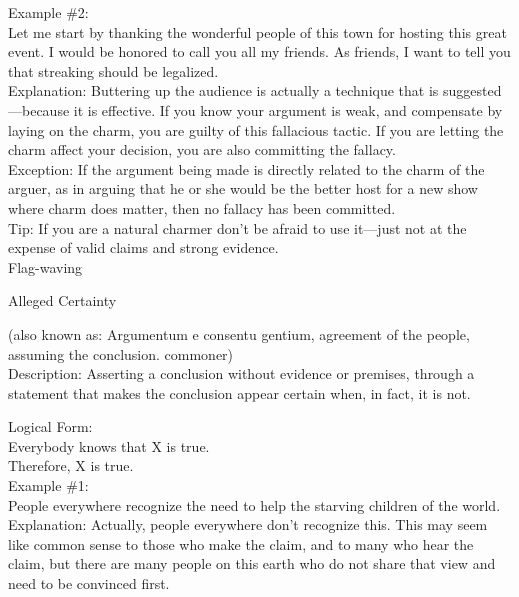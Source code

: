 \documentclass[a4paper,12pt,single,pdftex]{scrbook}
\begin{document}
    
      Example \#2:
    \\

    
      Let me start by thanking the wonderful people of this town for hosting this great event.  I would be honored to call you all my friends.  As friends, I want to tell you that streaking should be legalized.
    \\

    
      Explanation: Buttering up the audience is actually a technique that is suggested—because it is effective.  If you know your argument is weak, and compensate by laying on the charm, you are guilty of this fallacious tactic.  If you are letting the charm affect your decision, you are also committing the fallacy.
    \\

    
      Exception: If the argument being made is directly related to the charm of the arguer, as in arguing that he or she would be the better host for a new show where charm does matter, then no fallacy has been committed.
    \\

    
      Tip: If you are a natural charmer don’t be afraid to use it—just not at the expense of valid claims and strong evidence.
    \\

  

Flag-waving

Alleged Certainty
    
      (also known as: Argumentum e consentu gentium, agreement of the people, assuming the conclusion. commoner)
    \\

  
    Description: Asserting a conclusion without evidence or premises, through a statement that makes the conclusion appear certain when, in fact, it is not.

    
      Logical Form:
    \\

    
      Everybody knows that X is true.
    \\

    
      Therefore, X is true.
    \\

    
      Example \#1:
    \\

    
      People everywhere recognize the need to help the starving children of the world.
    \\

    
      Explanation: Actually, people everywhere don’t recognize this.  This may seem like common sense to those who make the claim, and to many who hear the claim, but there are many people on this earth who do not share that view and need to be convinced first.
    \\
\end{document}
